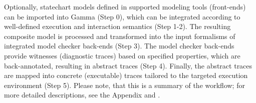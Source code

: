 Optionally, statechart models defined in supported modeling tools (front-ends) can be imported into Gamma (Step 0), which can be integrated according to well-defined execution and interaction semantics (Step 1-2). The resulting composite model is processed and transformed into the input formalisms of integrated model checker back-ends (Step 3). The model checker back-ends provide witnesses (diagnostic traces) based on specified properties, which are back-annotated, resulting in abstract traces (Step 4).
Finally, the abstract traces are mapped into concrete (executable) traces tailored to the targeted execution environment (Step 5). Please note, that this is a summary of the workflow; for more detailed descriptions, see the Appendix and \cite{mixed_statecharts_2020}.